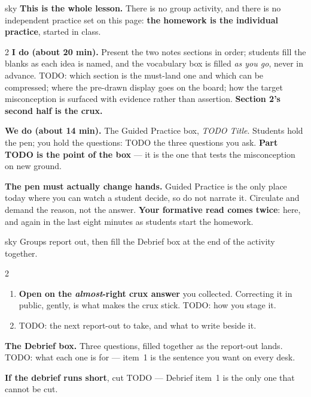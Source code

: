 \documentclass[10pt]{article}
\begin{document}
\boxguard
\begin{skillbox}{sky}
\textbf{This is the whole lesson.} There is no group activity, and there is no independent
practice set on this page: \textbf{the homework is the individual practice}, started in class.
\begin{multicols}{2}
\textbf{I do (about 20 min).} Present the two notes sections in order; students fill the blanks
as each idea is named, and the vocabulary box is filled \emph{as you go}, never in advance. TODO:
which section is the must-land one and which can be compressed; where the pre-drawn display goes
on the board; how the target misconception is surfaced with evidence rather than assertion.
\textbf{Section 2's second half is the crux.}

\columnbreak
\textbf{We do (about 14 min).} The Guided Practice box, \emph{TODO Title}. Students hold the pen;
you hold the questions: TODO the three questions you ask. \textbf{Part TODO is the point of the
box} --- it is the one that tests the misconception on new ground.

\textbf{The pen must actually change hands.} Guided Practice is the only place today where you
can watch a student decide, so do not narrate it. Circulate and demand the reason, not the
answer. \textbf{Your formative read comes twice}: here, and again in the last eight minutes as
students start the homework.
\end{multicols}
\end{skillbox}

\boxguard
\begin{skillbox}{sky}
Groups report out, then fill the Debrief box at the end of the activity together.
\begin{multicols}{2}
\begin{enumerate}[leftmargin=1.3em, nosep, itemsep=3pt]
  \item \textbf{Open on the \emph{almost}-right crux answer} you collected. Correcting it in
        public, gently, is what makes the crux stick. TODO: how you stage it.
  \item TODO: the next report-out to take, and what to write beside it.
\end{enumerate}
\columnbreak
\textbf{The Debrief box.} Three questions, filled together as the report-out lands. TODO: what
each one is for --- item~1 is the sentence you want on every desk.

\textbf{If the debrief runs short}, cut TODO --- Debrief item~1 is the only one that cannot
be cut.
\end{multicols}
\end{skillbox}
\end{document}
